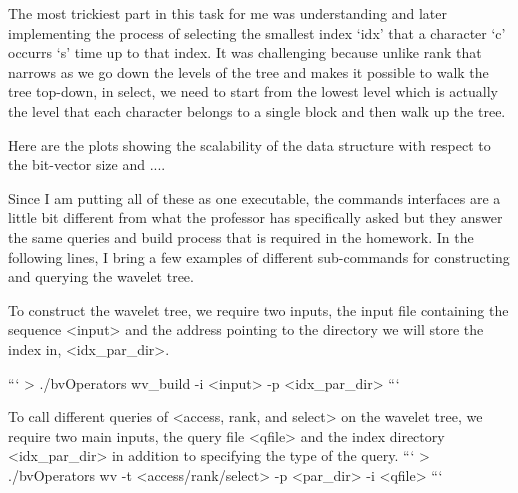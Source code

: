 \documentclass[11pt]{article}
\begin{document}
    The most trickiest part in this task for me was understanding and later implementing the process of
    selecting the smallest index `idx' that a character `c' occurrs `s' time up to that index.
    It was challenging because unlike rank that narrows as we go down the levels of the tree
    and makes it possible to walk the tree top-down, in select, we need to start from the lowest level
    which is actually the level that each character belongs to a single block and then walk up the tree.

    Here are the plots showing the scalability of the data structure with respect to the bit-vector size
    and ....


    Since I am putting all of these as one executable, the commands interfaces are a little bit
    different from what the professor has specifically asked but they answer the same queries and
    build process that is required in the homework.
    In the following lines, I bring a few examples of different sub-commands for constructing and querying the wavelet tree.

    To construct the wavelet tree, we require two inputs, the input file containing the sequence <input>
    and the address pointing to the directory we will store the index in, <idx_par_dir>.

    ```
    > ./bvOperators wv_build -i <input> -p <idx_par_dir>
    ```

    To call different queries of <access, rank, and select> on the wavelet tree,
    we require two main inputs, the query file <qfile> and the index directory <idx_par_dir>
    in addition to specifying the type of the query.
    ```
    > ./bvOperators wv -t <access/rank/select> -p <par_dir> -i <qfile>
    ```
\end{document}
